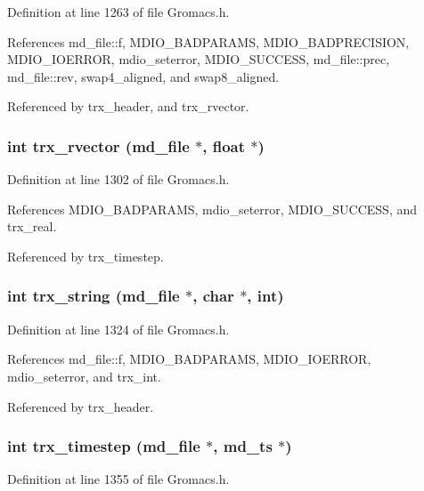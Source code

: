 Definition at line 1263 of file Gromacs.h.

References md\_\-file::f, MDIO\_\-BADPARAMS, MDIO\_\-BADPRECISION, MDIO\_\-IOERROR, mdio\_\-seterror, MDIO\_\-SUCCESS, md\_\-file::prec, md\_\-file::rev, swap4\_\-aligned, and swap8\_\-aligned.

Referenced by trx\_\-header, and trx\_\-rvector.
\subsubsection{\setlength{\rightskip}{0pt plus 5cm}int trx\_\-rvector ({\bf md\_\-file} $\ast$, float $\ast$)\hspace{0.3cm}{\tt  [static]}}\label{Gromacs_8h_a46}




Definition at line 1302 of file Gromacs.h.

References MDIO\_\-BADPARAMS, mdio\_\-seterror, MDIO\_\-SUCCESS, and trx\_\-real.

Referenced by trx\_\-timestep.
\subsubsection{\setlength{\rightskip}{0pt plus 5cm}int trx\_\-string ({\bf md\_\-file} $\ast$, char $\ast$, int)\hspace{0.3cm}{\tt  [static]}}\label{Gromacs_8h_a47}




Definition at line 1324 of file Gromacs.h.

References md\_\-file::f, MDIO\_\-BADPARAMS, MDIO\_\-IOERROR, mdio\_\-seterror, and trx\_\-int.

Referenced by trx\_\-header.
\subsubsection{\setlength{\rightskip}{0pt plus 5cm}int trx\_\-timestep ({\bf md\_\-file} $\ast$, {\bf md\_\-ts} $\ast$)\hspace{0.3cm}{\tt  [static]}}\label{Gromacs_8h_a48}




Definition at line 1355 of file Gromacs.h.

